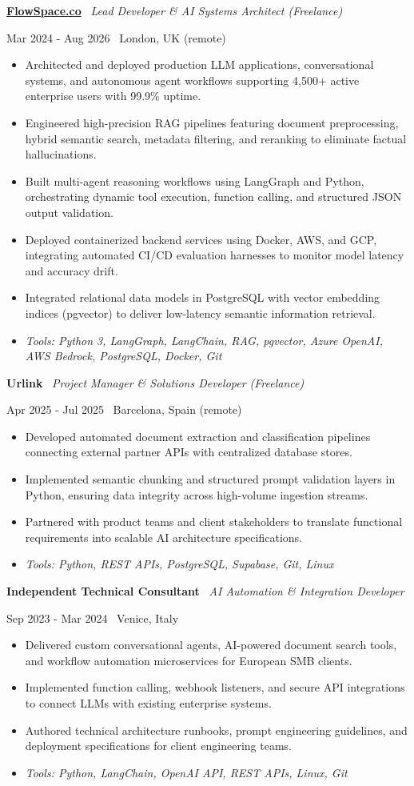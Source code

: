\documentclass[a4paper,10pt]{article}
\newcommand{\role}[4]{%
  \vspace{2pt}\noindent
  \begin{minipage}[t]{0.70\textwidth}\raggedright\textbf{#1} \textbullet\ \textit{#3}\end{minipage}%
  \hfill
  \begin{minipage}[t]{0.28\textwidth}\raggedleft\footnotesize\color{gray}#2 \textbullet\ #4\end{minipage}%
  \vspace{1pt}%
}
\begin{document}
\role{\href{https://flowspace.co}{FlowSpace.co}}{Mar 2024 - Aug 2026}{Lead Developer \& AI Systems Architect (Freelance)}{London, UK (remote)}
\begin{itemize}
  \item Architected and deployed production LLM applications, conversational systems, and autonomous agent workflows supporting 4,500+ active enterprise users with 99.9\% uptime.
  \item Engineered high-precision RAG pipelines featuring document preprocessing, hybrid semantic search, metadata filtering, and reranking to eliminate factual hallucinations.
  \item Built multi-agent reasoning workflows using LangGraph and Python, orchestrating dynamic tool execution, function calling, and structured JSON output validation.
  \item Deployed containerized backend services using Docker, AWS, and GCP, integrating automated CI/CD evaluation harnesses to monitor model latency and accuracy drift.
  \item Integrated relational data models in PostgreSQL with vector embedding indices (pgvector) to deliver low-latency semantic information retrieval.
  \item \textit{Tools: Python 3, LangGraph, LangChain, RAG, pgvector, Azure OpenAI, AWS Bedrock, PostgreSQL, Docker, Git}
\end{itemize}

\role{Urlink}{Apr 2025 - Jul 2025}{Project Manager \& Solutions Developer (Freelance)}{Barcelona, Spain (remote)}
\begin{itemize}
  \item Developed automated document extraction and classification pipelines connecting external partner APIs with centralized database stores.
  \item Implemented semantic chunking and structured prompt validation layers in Python, ensuring data integrity across high-volume ingestion streams.
  \item Partnered with product teams and client stakeholders to translate functional requirements into scalable AI architecture specifications.
  \item \textit{Tools: Python, REST APIs, PostgreSQL, Supabase, Git, Linux}
\end{itemize}

\role{Independent Technical Consultant}{Sep 2023 - Mar 2024}{AI Automation \& Integration Developer}{Venice, Italy}
\begin{itemize}
  \item Delivered custom conversational agents, AI-powered document search tools, and workflow automation microservices for European SMB clients.
  \item Implemented function calling, webhook listeners, and secure API integrations to connect LLMs with existing enterprise systems.
  \item Authored technical architecture runbooks, prompt engineering guidelines, and deployment specifications for client engineering teams.
  \item \textit{Tools: Python, LangChain, OpenAI API, REST APIs, Linux, Git}
\end{itemize}
\end{document}
